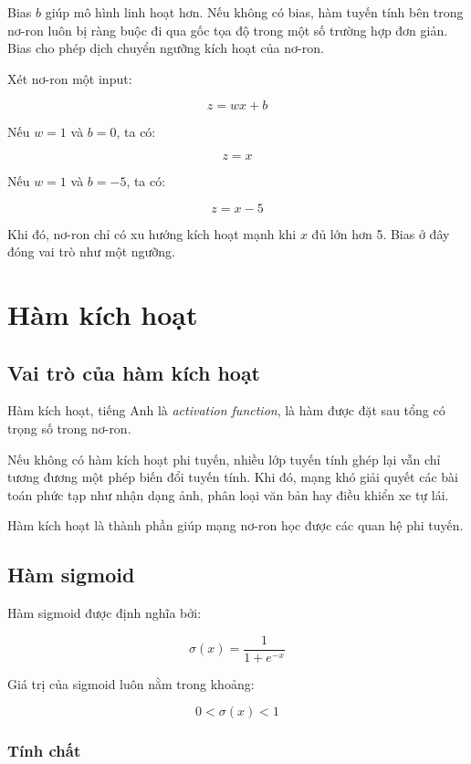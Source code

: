 \documentclass[12pt,a4paper]{report}
\begin{document}
Bias $b$ giúp mô hình linh hoạt hơn. Nếu không có bias, hàm tuyến tính bên trong nơ-ron luôn bị ràng buộc đi qua gốc tọa độ trong một số trường hợp đơn giản. Bias cho phép dịch chuyển ngưỡng kích hoạt của nơ-ron.

\begin{vidu}
Xét nơ-ron một input:

\[
    z = wx + b
\]

Nếu $w=1$ và $b=0$, ta có:

\[
    z = x
\]

Nếu $w=1$ và $b=-5$, ta có:

\[
    z = x - 5
\]

Khi đó, nơ-ron chỉ có xu hướng kích hoạt mạnh khi $x$ đủ lớn hơn 5. Bias ở đây đóng vai trò như một ngưỡng.
\end{vidu}

\chapter{Hàm kích hoạt}

\section{Vai trò của hàm kích hoạt}

Hàm kích hoạt, tiếng Anh là \textit{activation function}, là hàm được đặt sau tổng có trọng số trong nơ-ron.

Nếu không có hàm kích hoạt phi tuyến, nhiều lớp tuyến tính ghép lại vẫn chỉ tương đương một phép biến đổi tuyến tính. Khi đó, mạng khó giải quyết các bài toán phức tạp như nhận dạng ảnh, phân loại văn bản hay điều khiển xe tự lái.

\begin{ghinho}
Hàm kích hoạt là thành phần giúp mạng nơ-ron học được các quan hệ phi tuyến.
\end{ghinho}

\section{Hàm sigmoid}

Hàm sigmoid được định nghĩa bởi:

\[
    \sigma(x) = \frac{1}{1+e^{-x}}
\]

Giá trị của sigmoid luôn nằm trong khoảng:

\[
    0 < \sigma(x) < 1
\]

\subsection{Tính chất}
\end{document}

